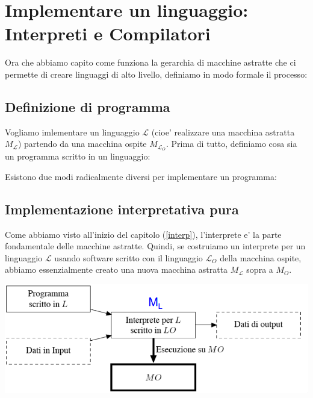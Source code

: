 \section{Implementare un linguaggio: Interpreti e Compilatori}
Ora che abbiamo capito come funziona la gerarchia di macchine astratte che ci permette di creare linguaggi di alto livello, definiamo in modo formale il processo:

\subsection{Definizione di programma}
Vogliamo imlementare un linguaggio $ \mathcal{L} $ (cioe' realizzare una macchina astratta $ M_\mathcal{L} $) partendo da una macchina ospite $ M_{\mathcal{L}_O} $. Prima di tutto, definiamo cosa sia un programma scritto in un linguaggio:

Esistono due modi radicalmente diversi per implementare un programma:

\subsection{Implementazione interpretativa pura}
Come abbiamo visto all'inizio del capitolo (\ref{interp}), l'interprete e' la parte fondamentale delle macchine astratte. Quindi, se costruiamo un interprete per un linguaggio $ \mathcal{L} $ usando software scritto con il linguaggio $ \mathcal{L}_O $ della macchina ospite, abbiamo essenzialmente creato una nuova macchina astratta $ M_\mathcal{L} $ sopra a $ M_O $. 

\begin{center}
  \includegraphics[scale=0.5]{img/2024-12-14-12-08-05.png}
\end{center}

